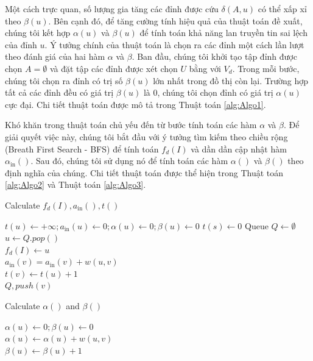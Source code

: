  	Một cách trực quan, số lượng gia tăng các đỉnh được cứu $\delta(A, u)$ có thể xấp xỉ theo $\beta(u)$. Bên cạnh đó, để tăng cường tính hiệu quả của thuật toán đề xuất, chúng tôi kết hợp $\alpha(u)$ và $\beta(u)$ để tính toán khả năng lan truyền tin sai lệch của đỉnh $u$. Ý tưởng chính của thuật toán là chọn ra các đỉnh một cách lần lượt theo đánh giá của hai hàm $\alpha$ và $\beta$. Ban đầu, chúng tôi khởi tạo tập đỉnh được chọn $A=\emptyset$ và đặt tập các đỉnh được xét chọn $U$ bằng với $V_{d}$. Trong mỗi bước, chúng tôi chọn ra đỉnh có trị số $\beta(u)$ lớn nhất trong đồ thị còn lại. Trường hợp tất cả các đỉnh đều có giá trị $\beta(u)$ là 0, chúng tôi chọn đỉnh có giá trị $\alpha(u)$ cực đại. Chi tiết thuật toán được mô tả trong Thuật toán \ref{alg:Algo1}.
 	
 	Khó khăn trong thuật toán chủ yếu đến từ bước tính toán các hàm $\alpha$ và $\beta$. Để giải quyết việc này, chúng tôi bắt đầu với ý tưởng tìm kiếm theo chiều rộng (Breath First Search - BFS) để tính toán $f_{d}(I)$ và dần dần cập nhật hàm $\alpha_{\text{in}}()$. Sau đó, chúng tôi sử dụng nó để tính toán các hàm  $\alpha()$ và $\beta()$ theo định nghĩa của chúng. Chi tiết thuật toán được thể hiện trong Thuật toán \ref{alg:Algo2} và Thuật toán \ref{alg:Algo3}.
 	\begin{algorithm}[hpt]
 		\caption{Calculate $f_{d}(I), a_{\text{in}}(), t()$}
 		\label{alg:Algo2}
 		{
 			$t(u) \gets +\infty; a_{\text{in}}(u) \gets 0; \alpha(u) \gets 0; \beta(u) \gets 0$
 		}
 		{
 			$t(s) \gets 0$
 		} 
 		Queue $Q \gets \emptyset$
 		\\
 		{
 			$u \gets Q.pop()$
 			\\
 			$f_{d}(I) \gets u$
 			\\
 			{
 				{
 					{
 						$a_{\text{in}}(v)=a_{\text{in}}(v)+w(u,v)$
 						\\
 						{
 							$t(v) \gets t(u)+1$
 							\\
 							$Q,push(v)$
 						}
 					}
 				}
 			}	
 		}
 	\end{algorithm}
 	
 	\begin{algorithm}[hpt]
 		\caption{Calculate $\alpha()$ and $\beta()$}
 		\label{alg:Algo3}
 		{
 			$\alpha(u) \gets 0; \beta(u) \gets 0$
 			\\
 			{
 				{
 					$\alpha(u) \gets \alpha(u)+w(u,v)$
 					\\
 					{
 						$\beta(u) \gets \beta(u)+1$
 					}
 				}
 			}
 		}
 	\end{algorithm}
 	
